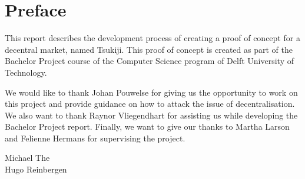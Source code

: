 \section*{Preface}
This report describes the development process of creating a proof of concept for a decentral market, named Tsukiji. 
This proof of concept is created as part of the Bachelor Project course of the Computer Science program of Delft University of Technology.

We would like to thank Johan Pouwelse for giving us the opportunity to work on this project and provide guidance on how to attack the issue of decentralisation.
We also want to thank Raynor Vliegendhart for assisting us while developing the Bachelor Project report.
Finally, we want to give our thanks to Martha Larson and Felienne Hermans for supervising the project.

\begin{flushright}
Michael The \\
Hugo Reinbergen
\end{flushright}